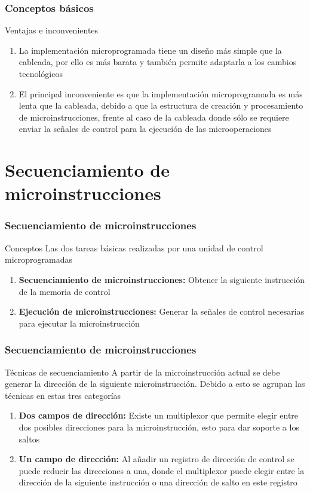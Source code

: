 \documentclass{beamer}
\begin{document}
\begin{frame}
	\frametitle{Conceptos básicos}
	\begin{block}{Ventajas e inconvenientes}
	\begin{enumerate}
		\item La implementación microprogramada tiene un diseño más simple que la cableada, por ello es más barata y también permite adaptarla a los cambios tecnológicos
		\item El principal inconveniente es que la implementación microprogramada es más lenta que la cableada, debido a que la estructura de creación y procesamiento de microinstrucciones, frente al caso de la cableada donde sólo se requiere enviar la señales de control para la ejecución de las microoperaciones
	\end{enumerate}
	\end{block}		
\end{frame}




\section{Secuenciamiento de microinstrucciones}

\begin{frame}
	\frametitle{Secuenciamiento de microinstrucciones}
	\begin{block}{Conceptos}
	Las dos tareas básicas realizadas por una unidad de control microprogramadas
	\begin{enumerate}
		\item \textbf{Secuenciamiento de microinstrucciones:} Obtener la siguiente instrucción de la memoria de control
		\item \textbf{Ejecución de microinstrucciones:} Generar la señales de control necesarias para ejecutar la microinstrucción
	\end{enumerate}
	\end{block}	
\end{frame}


\begin{frame}
	\frametitle{Secuenciamiento de microinstrucciones}
	\begin{block}{Técnicas de secuenciamiento}
	A partir de la microinstrucción actual se debe generar la dirección de la siguiente microinstrucción. Debido a esto se agrupan las técnicas en estas tres categorías
	\begin{enumerate}
		\item \textbf{Dos campos de dirección:} Existe un multiplexor que permite elegir entre dos posibles direcciones para la microinstrucción, esto para dar soporte a los saltos
		\item \textbf{Un campo de dirección:} Al añadir un registro de dirección de control se puede reducir las direcciones a una, donde el multiplexor puede elegir entre la dirección de la siguiente instrucción o una dirección de salto en este registro
	\end{enumerate}
	\end{block}	
\end{frame}
\end{document}
